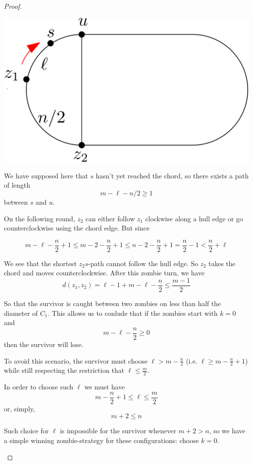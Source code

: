 \documentclass[letterpaper, 10pt]{article}
\begin{document}
\begin{proof}
\begin{proofpart}
\begin{center}
\includegraphics[scale=0.15]{diagramCaseIA1_1}
\end{center}

We have supposed here that $s$ hasn't yet reached the chord, so there exists a path of length
\[m - \ell -n/2 \geq 1 \]
between $s$ and $u$.

On the following round, $z_2$ can either follow $z_1$ clockwise along a hull edge or go
counterclockwise using the chord edge. But since

\[ m - \ell - \frac{n}{2} +1 \leq m - 2 -\frac{n}{2}  +1 \leq n - 2 - \frac{n}{2} +1 = \frac{n}{2} -1 < \frac{n}{2} + \ell\]

We see that the shortest $z_2s$-path cannot follow the hull edge.
So $z_2$ takes the chord and moves counterclockwise.
After this zombie turn, we have
\[d(z_1, z_2) = \ell - 1 + m - \ell - \frac{n}{2} \leq \frac{m-1}{2}\]

So that the survivor is caught between two zombies on less than half the diameter of $C_1$.
This allows us to conlude that if the zombies start with $k=0$ and
\[ m - \ell -\frac{n}{2}  \geq 0 \]
then the survivor will lose.

To avoid this scenario, the survivor must choose $\ell > m - \frac{n}{2}$
(i.e. $\ell \geq m - \frac{n}{2} +1$)
while still respecting the restriction that $\ell \leq \frac{m}{2}$.

In order to choose such $\ell$ we must have
\[ m - \frac{n}{2} +1 \leq \ell \leq \frac{m}{2} \]
or, simply,
\[ m + 2 \leq n \]

Such choice for $\ell$ is impossible for the survivor whenever
$m+2 > n$, so we have a simple winning zombie-strategy for these configurations:
choose $k=0$.


\end{proofpart}
\end{proof}
\end{document}
